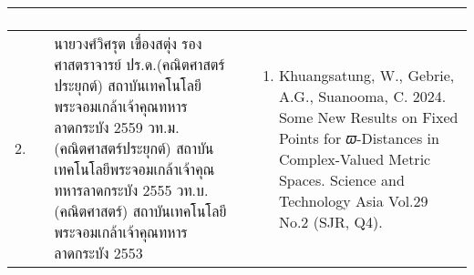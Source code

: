 {\begin{center}
\begin{longtable}{|p{}|p{}|p{}|}
\begin{enumerate}[series=tar]
\end{enumerate}
\\ \hline
2. &
นายวงศ์วิศรุต เขื่องสตุ่ง \newline 
รองศาสตราจารย์	\newline
ปร.ด.(คณิตศาสตร์ประยุกต์) \newline สถาบันเทคโนโลยีพระจอมเกล้าเจ้าคุณทหารลาดกระบัง 2559 \newline
วท.ม.(คณิตศาสตร์ประยุกต์) \newline สถาบันเทคโนโลยีพระจอมเกล้าเจ้าคุณทหารลาดกระบัง 2555  \newline
วท.บ.(คณิตศาสตร์) \newline สถาบันเทคโนโลยีพระจอมเกล้าเจ้าคุณทหารลาดกระบัง 2553
& 
\begin{enumerate}[series=note]
	\item Khuangsatung, W.,  Gebrie, A.G.,   Suanooma,  C. 2024. Some New Results on Fixed Points for 𝜛-Distances in Complex-Valued Metric Spaces. Science and Technology Asia Vol.29 No.2 (SJR, Q4).   

\end{enumerate}
\end{longtable}
\end{center}}
